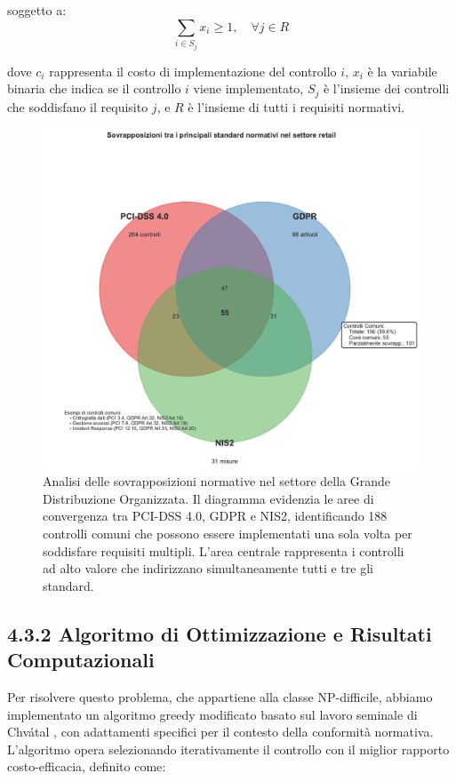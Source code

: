 soggetto a:
\begin{equation}
\sum_{i \in S_j} x_i \geq 1, \quad \forall j \in R
\end{equation}

dove $c_i$ rappresenta il costo di implementazione del controllo $i$, $x_i$ è la variabile binaria che indica se il controllo $i$ viene implementato, $S_j$ è l'insieme dei controlli che soddisfano il requisito $j$, e $R$ è l'insieme di tutti i requisiti normativi.

\begin{figure}[htbp]
\centering
\includegraphics[width=1\textwidth]{thesis_figures/cap4/figura_4_1_venn_normative.pdf}
\caption{Analisi delle sovrapposizioni normative nel settore della Grande Distribuzione Organizzata. Il diagramma evidenzia le aree di convergenza tra PCI-DSS 4.0, GDPR e NIS2, identificando 188 controlli comuni che possono essere implementati una sola volta per soddisfare requisiti multipli. L'area centrale rappresenta i controlli ad alto valore che indirizzano simultaneamente tutti e tre gli standard.}
\label{fig:venn_normative}
\end{figure}

\subsection{4.3.2 Algoritmo di Ottimizzazione e Risultati Computazionali}

Per risolvere questo problema, che appartiene alla classe NP-difficile, abbiamo implementato un algoritmo greedy modificato basato sul lavoro seminale di Chvátal \autocite{Chvatal1979}, con adattamenti specifici per il contesto della conformità normativa. L'algoritmo opera selezionando iterativamente il controllo con il miglior rapporto costo-efficacia, definito come:

